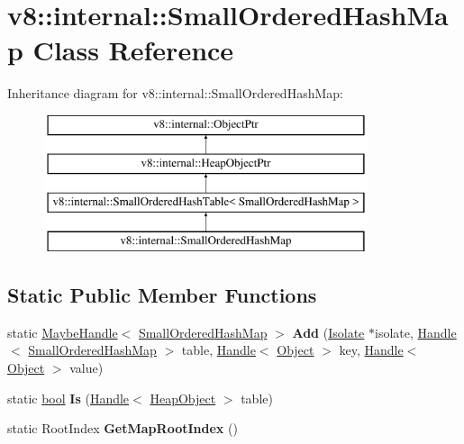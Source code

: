 \hypertarget{classv8_1_1internal_1_1SmallOrderedHashMap}{}\section{v8\+:\+:internal\+:\+:Small\+Ordered\+Hash\+Map Class Reference}
\label{classv8_1_1internal_1_1SmallOrderedHashMap}
Inheritance diagram for v8\+:\+:internal\+:\+:Small\+Ordered\+Hash\+Map\+:\begin{figure}[H]
\begin{center}
\leavevmode
\includegraphics[height=4.000000cm]{classv8_1_1internal_1_1SmallOrderedHashMap}
\end{center}
\end{figure}
\subsection*{Static Public Member Functions}
\begin{DoxyCompactItemize}
\item 
\mbox{\label{classv8_1_1internal_1_1SmallOrderedHashMap_a6582ec96da72ea7d2b90d7e860fd8cff}} 
static \mbox{\hyperlink{classv8_1_1internal_1_1MaybeHandle}{Maybe\+Handle}}$<$ \mbox{\hyperlink{classv8_1_1internal_1_1SmallOrderedHashMap}{Small\+Ordered\+Hash\+Map}} $>$ {\bfseries Add} (\mbox{\hyperlink{classv8_1_1internal_1_1Isolate}{Isolate}} $\ast$isolate, \mbox{\hyperlink{classv8_1_1internal_1_1Handle}{Handle}}$<$ \mbox{\hyperlink{classv8_1_1internal_1_1SmallOrderedHashMap}{Small\+Ordered\+Hash\+Map}} $>$ table, \mbox{\hyperlink{classv8_1_1internal_1_1Handle}{Handle}}$<$ \mbox{\hyperlink{classv8_1_1internal_1_1Object}{Object}} $>$ key, \mbox{\hyperlink{classv8_1_1internal_1_1Handle}{Handle}}$<$ \mbox{\hyperlink{classv8_1_1internal_1_1Object}{Object}} $>$ value)
\item 
\mbox{\label{classv8_1_1internal_1_1SmallOrderedHashMap_a32f5e897763baeb173b3957eee1f2620}} 
static \mbox{\hyperlink{classbool}{bool}} {\bfseries Is} (\mbox{\hyperlink{classv8_1_1internal_1_1Handle}{Handle}}$<$ \mbox{\hyperlink{classv8_1_1internal_1_1HeapObject}{Heap\+Object}} $>$ table)
\item 
\mbox{\label{classv8_1_1internal_1_1SmallOrderedHashMap_aba39627ff6e7e1654303fefffc5ec5d0}} 
static Root\+Index {\bfseries Get\+Map\+Root\+Index} ()
\end{DoxyCompactItemize}
